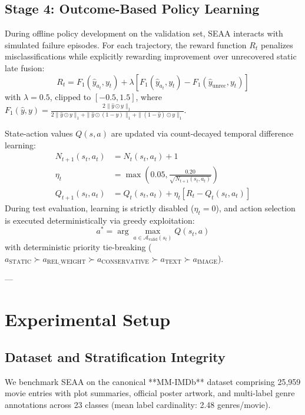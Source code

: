 \documentclass[journal]{IEEEtran}
\begin{document}
\subsection{Stage 4: Outcome-Based Policy Learning}
During offline policy development on the validation set, SEAA interacts with simulated failure episodes. For each trajectory, the reward function $R_t$ penalizes misclassifications while explicitly rewarding improvement over unrecovered static late fusion:
\begin{equation}
    R_t = F_1(\hat{y}_{a_t}, y_t) + \lambda \left[ F_1(\hat{y}_{a_t}, y_t) - F_1(\hat{y}_{\text{unrec}}, y_t) \right]
\end{equation}
with $\lambda = 0.5$, clipped to $[-0.5, 1.5]$, where $F_1(\hat{y}, y) = \frac{2 \| \hat{y} \odot y \|_1}{2 \| \hat{y} \odot y \|_1 + \| \hat{y} \odot (1-y) \|_1 + \| (1-\hat{y}) \odot y \|_1}$.

State-action values $Q(s, a)$ are updated via count-decayed temporal difference learning:
\begin{align}
    N_{t+1}(s_t, a_t) &= N_t(s_t, a_t) + 1 \\
    \eta_t &= \max\left( 0.05, \frac{0.20}{\sqrt{N_{t+1}(s_t, a_t)}} \right) \\
    Q_{t+1}(s_t, a_t) &= Q_t(s_t, a_t) + \eta_t \left[ R_t - Q_t(s_t, a_t) \right]
\end{align}
During test evaluation, learning is strictly disabled ($\eta_t = 0$), and action selection is executed deterministically via greedy exploitation:
\begin{equation}
    a^* = \arg\max_{a \in \mathcal{A}_{\text{valid}}(s_t)} Q(s_t, a)
\end{equation}
with deterministic priority tie-breaking ($a_{\text{STATIC}} \succ a_{\text{REL\_WEIGHT}} \succ a_{\text{CONSERVATIVE}} \succ a_{\text{TEXT}} \succ a_{\text{IMAGE}}$).

---

\section{Experimental Setup}

\subsection{Dataset and Stratification Integrity}
We benchmark SEAA on the canonical **MM-IMDb** dataset comprising 25,959 movie entries with plot summaries, official poster artwork, and multi-label genre annotations across 23 classes (mean label cardinality: 2.48 genres/movie).
\end{document}
